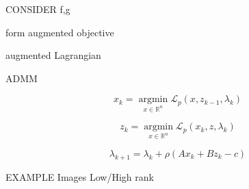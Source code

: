 CONSIDER f,g

form augmented objective

augmented  Lagrangian

ADMM

$$x_k=\underset{x \in \mathbb{R}^{n} }{\operatorname{argmin}}\mathcal{L}_p(x,z_{k-1},\lambda_k) $$

$$z_k=\underset{x \in \mathbb{R}^{n} }{\operatorname{argmin}}\mathcal{L}_p(x_k,z,\lambda_k) $$

$$ \lambda_{k+1}=\lambda_k+\rho(Ax_k+Bz_k-c)$$

EXAMPLE Images Low/High rank



